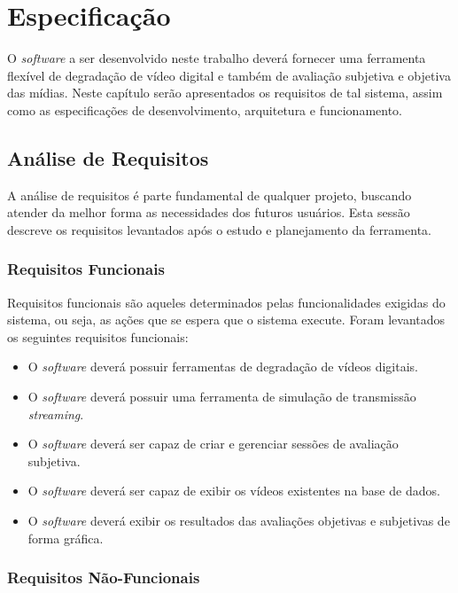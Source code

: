 
\chapter{Especificação} %

O \emph{software} a ser desenvolvido neste trabalho deverá fornecer uma ferramenta flexível de degradação de vídeo digital e também de avaliação subjetiva e objetiva das mídias.
Neste capítulo serão apresentados os requisitos de tal sistema, assim como as especificações de desenvolvimento, arquitetura e funcionamento.

\section{Análise de Requisitos}

A análise de requisitos é parte fundamental de qualquer projeto, buscando atender da melhor forma as necessidades dos futuros usuários.
Esta sessão descreve os requisitos levantados após o estudo e planejamento da ferramenta.

\subsection{Requisitos Funcionais}

Requisitos funcionais são aqueles determinados pelas funcionalidades exigidas do sistema, ou seja, as ações que se espera que o sistema execute. 
Foram levantados os seguintes requisitos funcionais:

\begin{itemize}
	\item O \emph{software} deverá possuir ferramentas de degradação de vídeos digitais.
	\item O \emph{software} deverá possuir uma ferramenta de simulação de transmissão \emph{streaming}.
	\item O \emph{software} deverá ser capaz de criar e gerenciar sessões de avaliação subjetiva.
	\item O \emph{software} deverá ser capaz de exibir os vídeos existentes na base de dados.
	\item O \emph{software} deverá exibir os resultados das avaliações objetivas e subjetivas de forma gráfica.
\end{itemize}

\subsection{Requisitos Não-Funcionais}

